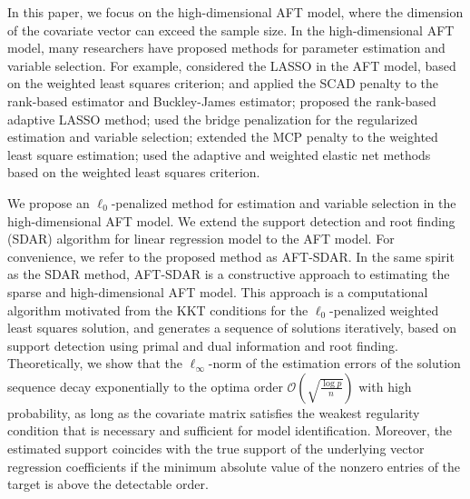 \documentclass[12pt]{article}
\begin{document}
In this paper, we focus on the high-dimensional  AFT model, where the dimension of the covariate vector can exceed the sample size.
In the high-dimensional AFT model,
many researchers have proposed methods for parameter estimation and variable selection.
For example,
\cite{huang2006regularized}
considered the LASSO
\citep{tibshirani1996regression}
 in the AFT model, based on the  weighted least squares criterion;
\cite{johnson2008variable} and \cite{johnson2008penalized}
applied the SCAD
\citep{fan2001variable}
penalty to  the rank-based estimator and Buckley-James estimator;
\cite{cai2009regularized}
proposed the rank-based adaptive LASSO
\citep{zou2006adaptive}
 method;
\cite{huang2010variable}
used the bridge penalization for the regularized estimation and variable selection;
\cite{hu2013adjusted}
 extended the MCP
\citep{zhang2010nearly}
penalty to the weighted least square estimation;
{
\cite{khan2016variable}
used  the adaptive and  weighted elastic net methods
\citep{zou2009adaptive,hong2010weighted}
based on the weighted least squares criterion.}


We propose an $\ell_0$-penalized method for estimation and variable selection in the high-dimensional AFT model.  We extend the support detection and root finding (SDAR) algorithm
 \citep{huang2018constructive}
for linear regression model to the
AFT model. For convenience, we refer to the proposed method as AFT-SDAR.
In the same spirit as the SDAR method, AFT-SDAR  is  a constructive approach to estimating the sparse and high-dimensional AFT model. This approach is a computational algorithm motivated from the KKT conditions for the $\ell_0$-penalized weighted least squares solution, and generates a sequence of solutions iteratively, based on support detection using primal and dual information and root finding.
Theoretically, we show  that the $\ell_{\infty}$-norm of  the estimation errors of the solution sequence decay exponentially to the optima order $\mathcal{O}(\sqrt{\frac{\log p}{n}})$ with high probability,  as long as the covariate matrix satisfies the weakest  regularity condition that  is necessary and sufficient for  model identification. Moreover, the estimated  support coincides with the true support  of the underlying vector regression coefficients  if the minimum absolute value of the nonzero entries of the target  is above the  detectable order.
\end{document}
